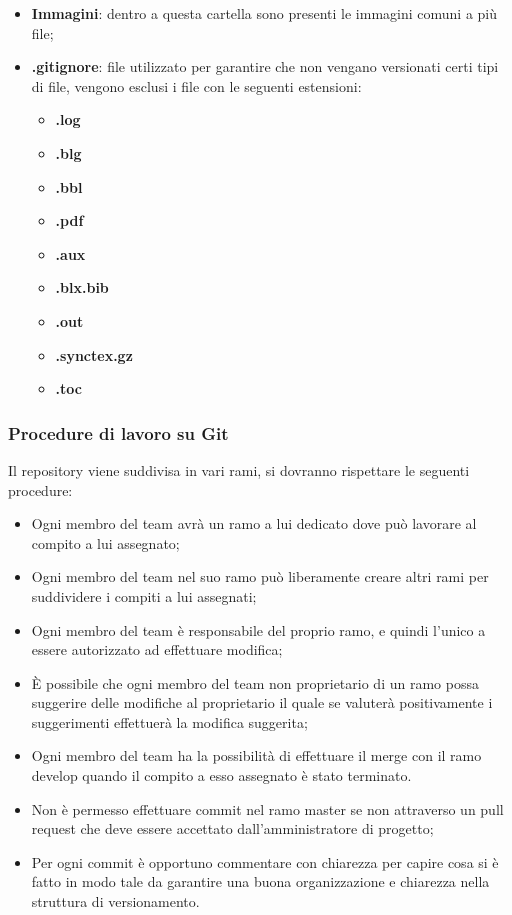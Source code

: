 \begin{itemize}
	\item \textbf{Immagini}: dentro a questa cartella sono presenti le immagini comuni a più file;
	\item \textbf{.gitignore}: file utilizzato per garantire che non vengano versionati certi tipi di file, vengono esclusi i file con le seguenti estensioni:
	\begin{itemize} 
		\item \textbf{.log}
		\item \textbf{.blg}
		\item \textbf{.bbl}
		\item \textbf{.pdf}
		\item \textbf{.aux}
		\item \textbf{.blx.bib}
		\item \textbf{.out}
		\item \textbf{.synctex.gz}
		\item \textbf{.toc}
	\end{itemize}
\end{itemize}
\subsubsection{Procedure di lavoro su Git}
Il repository viene suddivisa in vari rami, si dovranno rispettare le seguenti procedure:
\begin{itemize} 
\item Ogni membro del team avrà un ramo a lui dedicato dove può lavorare al compito a lui assegnato;
\item Ogni membro del team nel suo ramo può liberamente creare altri rami per suddividere i compiti a lui assegnati;
\item Ogni membro del team è responsabile del proprio ramo, e quindi l’unico a essere autorizzato ad effettuare modifica;
\item È possibile che ogni membro del team non proprietario di un ramo possa suggerire delle modifiche al proprietario il quale se valuterà positivamente i suggerimenti effettuerà la modifica suggerita;
\item Ogni membro del team ha la possibilità di effettuare il merge con il ramo develop quando il compito a esso assegnato è stato terminato.
\item Non è permesso effettuare commit nel ramo master se non attraverso un pull request che deve essere accettato dall’amministratore di progetto;
\item Per ogni commit è opportuno commentare con chiarezza per capire cosa si è fatto in modo tale da garantire una buona organizzazione e chiarezza nella struttura di versionamento.
\end{itemize}

